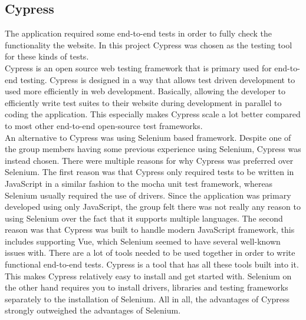 \subsection{Cypress}
The application required some end-to-end tests in order to fully check the functionality the website. In this project Cypress was chosen as the testing tool for these kinds of tests. \\[11pt]
Cypress is an open source web testing framework that is primary used for end-to-end testing. Cypress is designed in a way that allows test driven development to used more efficiently in web development. Basically, allowing the developer to efficiently write test suites to their website during development in parallel to coding the application. This especially makes Cypress scale a lot better compared to most other end-to-end open-source test frameworks. \\[11pt]
An alternative to Cypress was using Selenium based framework. Despite one of the group members having some previous experience using Selenium, Cypress was instead chosen. There were multiple reasons for why Cypress was preferred over Selenium. The first reason was that Cypress only required tests to be written in JavaScript in a similar fashion to the mocha unit test framework, whereas Selenium usually required the use of drivers. Since the application was primary developed using only JavaScript, the group felt there was not really any reason to using Selenium over the fact that it supports multiple languages. The second reason was that Cypress was built to handle modern JavaScript framework, this includes supporting Vue, which Selenium seemed to have several well-known issues with. There are a lot of tools needed to be used together in order to write functional end-to-end tests. Cypress is a tool that has all these tools built into it. This makes Cypress relatively easy to install and get started with. Selenium on the other hand requires you to install drivers, libraries and testing frameworks separately to the installation of Selenium. All in all, the advantages of Cypress strongly outweighed the advantages of Selenium. \\[11pt]
